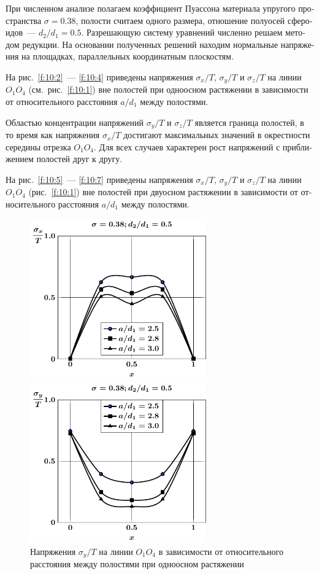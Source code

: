 \begin{russian}
{При численном анализе полагаем коэффициент Пуассона материала упругого} пространства $\sigma=0.38$, полости считаем одного размера, отношение полуосей сфероидов~--- $d_2/d_1=0.5$. Разрешающую систему уравнений численно решаем методом редукции. На основании полученных решений находим нормальные напряжения на площадках, параллельных координатным плоскостям.

На рис.~\ref{f:10:2}~--- \ref{f:10:4} приведены напряжения $\sigma_x/T$, $\sigma_y/T$ и $\sigma_z/T$ на линии $O_1O_4$ (см.~рис.~\ref{f:10:1}) вне полостей при одноосном растяжении в зависимости от относительного расстояния $a/d_1$ между полостями.

Областью концентрации напряжений $\sigma_y/T$ и $\sigma_z/T$ является граница полостей, в то время как напряжения $\sigma_x/T$ достигают максимальных значений в окрестности середины отрезка $O_1O_4$. Для всех случаев характерен рост напряжений с приближением полостей друг к другу.

На рис.~\ref{f:10:5}~--- \ref{f:10:7} приведены напряжения $\sigma_x/T$, $\sigma_y/T$ и $\sigma_z/T$ на линии $O_1O_4$ (рис.~\ref{f:10:1}) вне полостей при двуосном растяжении в зависимости от относительного расстояния $a/d_1$ между полостями.

\begin{figure}[h!]
\centering\footnotesize
\parbox[b]{7.5cm}{\centering\includegraphics[width=7.6cm]{cav4-oblate-a-d50-t1-sig_x.pdf}
\caption{Напряжения $\sigma_x/T$ на линии $O_1O_4$ в зависимости от относительного расстояния между полостями при одноосном растяжении
\label{f:10:2}}}\hfil\hfil
\parbox[b]{7.5cm}{\centering\includegraphics[width=7.6cm]{cav4-oblate-a-d50-t1-sig_y.pdf}
\caption{Напряжения $\sigma_y/T$ на линии $O_1O_4$ в зависимости от относительного расстояния между полостями при одноосном растяжении
\label{f:10:3}}}
\end{figure}


\end{russian}
